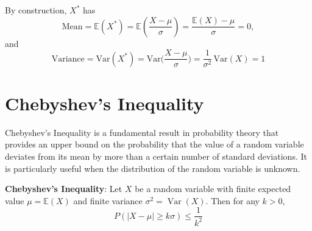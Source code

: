 \documentclass[twoside]{book}
\begin{document}
By construction, \(X^*\) has
\[
  \text{Mean} = \mathbb{E}\left( X^*\right)
  = \mathbb{E}\left( \frac{X - \mu}{\sigma}\right)
  = \frac{\mathbb{E}(X) - \mu}{\sigma}
  = 0,
\]
and
\[
  \text{Variance} = \mathrm{Var}(X^*)
  = \mathrm{Var}\biggl(\frac{X - \mu}{\sigma}\biggr)
  = \frac{1}{\sigma^2}\,\mathrm{Var}(X)
  = 1
\]

\section{Chebyshev's Inequality}
Chebyshev's Inequality is a fundamental result in probability theory that provides an upper bound on the probability that the value of a random variable deviates from its mean by more than a certain number of standard deviations. It is particularly useful when the distribution of the random variable is unknown.


\begin{textbox}
\textbf{Chebyshev's Inequality}: Let $X$ be a random variable with finite expected value $\mu = \mathbb{E}(X)$ and finite variance $\sigma^2 = \operatorname{Var}(X)$. Then for any $k > 0$,
\[
P(|X - \mu| \geq k\sigma) \leq \frac{1}{k^2}
\]
\end{textbox}
\end{document}
